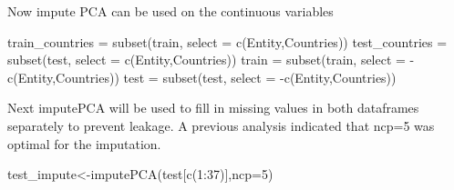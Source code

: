 \documentclass[
]{article}
\newenvironment{Shaded}{\begin{snugshade}}{\end{snugshade}}
\newcommand{\AttributeTok}[1]{\textcolor[rgb]{0.77,0.63,0.00}{#1}}
\newcommand{\DecValTok}[1]{\textcolor[rgb]{0.00,0.00,0.81}{#1}}
\newcommand{\FunctionTok}[1]{\textcolor[rgb]{0.00,0.00,0.00}{#1}}
\newcommand{\NormalTok}[1]{#1}
\newcommand{\OtherTok}[1]{\textcolor[rgb]{0.56,0.35,0.01}{#1}}
\newcommand{\SpecialCharTok}[1]{\textcolor[rgb]{0.00,0.00,0.00}{#1}}
\newcommand{\StringTok}[1]{\textcolor[rgb]{0.31,0.60,0.02}{#1}}
\begin{document}
Now impute PCA can be used on the continuous variables

\begin{Shaded}
\begin{Highlighting}[]
\NormalTok{train\_countries }\OtherTok{=} \FunctionTok{subset}\NormalTok{(train, }\AttributeTok{select =} \FunctionTok{c}\NormalTok{(Entity,Countries))}
\NormalTok{test\_countries }\OtherTok{=} \FunctionTok{subset}\NormalTok{(test, }\AttributeTok{select =} \FunctionTok{c}\NormalTok{(Entity,Countries))}
\NormalTok{train }\OtherTok{=} \FunctionTok{subset}\NormalTok{(train, }\AttributeTok{select =} \SpecialCharTok{{-}}\FunctionTok{c}\NormalTok{(Entity,Countries))}
\NormalTok{test }\OtherTok{=} \FunctionTok{subset}\NormalTok{(test, }\AttributeTok{select =} \SpecialCharTok{{-}}\FunctionTok{c}\NormalTok{(Entity,Countries))}
\end{Highlighting}
\end{Shaded}

Next imputePCA will be used to fill in missing values in both dataframes
separately to prevent leakage. A previous analysis indicated that ncp=5
was optimal for the imputation.

\begin{Shaded}
\end{Shaded}

\begin{Shaded}
\begin{Highlighting}[]
\NormalTok{test\_impute}\OtherTok{\textless{}{-}}\FunctionTok{imputePCA}\NormalTok{(test[}\FunctionTok{c}\NormalTok{(}\DecValTok{1}\SpecialCharTok{:}\DecValTok{37}\NormalTok{)],}\AttributeTok{ncp=}\DecValTok{5}\NormalTok{)}
\end{Highlighting}
\end{Shaded}
\end{document}
